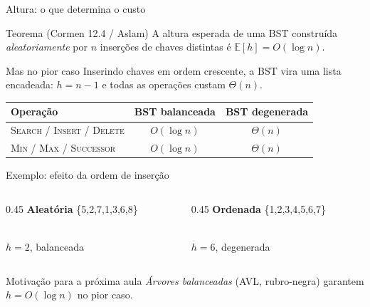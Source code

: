 \documentclass[aspectratio=169]{beamer}
\begin{document}
\begin{frame}{Altura: o que determina o custo}
\begin{block}{Teorema (Cormen 12.4 / Aslam)}
A altura esperada de uma BST construída \emph{aleatoriamente} por $n$ inserções
de chaves distintas é $\mathbb{E}[h] = O(\log n)$.
\end{block}
\begin{exampleblock}{Mas no pior caso}
Inserindo chaves em ordem crescente, a BST vira uma lista encadeada:
$h = n - 1$ e todas as operações custam $\Theta(n)$.
\end{exampleblock}
\begin{center}
\small
\begin{tabular}{lcc}
\toprule
Operação & BST balanceada & BST degenerada\\
\midrule
\textsc{Search / Insert / Delete} & $O(\log n)$ & $\Theta(n)$\\
\textsc{Min / Max / Successor}    & $O(\log n)$ & $\Theta(n)$\\
\bottomrule
\end{tabular}
\end{center}
\end{frame}

\begin{frame}[shrink=25]{Exemplo: efeito da ordem de inserção}
\begin{columns}[T]
\begin{column}{0.45\textwidth}
\centering\textbf{Aleatória} \{5,2,7,1,3,6,8\}\\[2pt]
\\[2pt]
\small $h = 2$, balanceada
\end{column}
\begin{column}{0.45\textwidth}
\centering\textbf{Ordenada} \{1,2,3,4,5,6,7\}\\[2pt]
\\[2pt]
\small $h = 6$, degenerada
\end{column}
\end{columns}
\vspace{4pt}
\begin{block}{Motivação para a próxima aula}
\emph{Árvores balanceadas} (AVL, rubro-negra) garantem $h = O(\log n)$ \alert{no pior caso}.
\end{block}
\end{frame}
\end{document}
